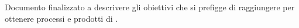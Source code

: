 Documento finalizzato a descrivere gli obiettivi che \gruppo si prefigge di raggiungere per ottenere processi e prodotti di .